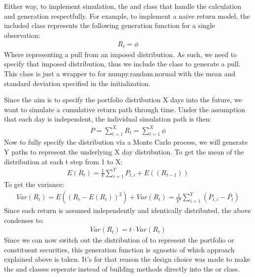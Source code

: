 \documentclass[letterpaper,10pt,english]{sphinxmanual}
\begin{document}
Either way, to implement simulation, the  and
 class that handle the calculation and generation
respectfully. For example, to implement a naive return model, the
included  class represents the following generation
function for a single observation:
\begin{equation*}
\begin{split}R_{t} = \phi\end{split}
\end{equation*}
Where \phi representing a pull from an imposed distribution. As
such, we need to specify that imposed distribution, thus we include the
 class to generate a pull. This class
is just a wrapper to for numpy.random.normal with the mean and standard
deviation specified in the initialization.

Since the aim is to specify the portfolio distribution X days into the
future, we want to simulate a cumulative return path through time. Under
the assumption that each day is independent, the individual simulation
path is then:
\begin{equation*}
\begin{split}P = \sum_{t=1}^{X} R_{t} = \sum_{t=1}^{X} \phi\end{split}
\end{equation*}
Now to fully specify the distribution via a Monte Carlo process, we will
generate Y paths to represent the underlying X day
distribution. To get the mean of the distribution at each t step
from 1 to X:
\begin{equation*}
\begin{split}E(R_{t}) = \frac{1}{Y} \sum_{i=1}^{Y} P_{t, i} + E((R_{t-1}))\end{split}
\end{equation*}
To get the variance:
\begin{equation*}
\begin{split}Var(R_{t}) = E\left(\left(R_{t} - E(R_{t})\right)^{2}\right) + Var(R_{t}) = \frac{1}{Y^{2}} \sum_{i=1}^{Y}\left(P_{t,i} - \bar{P_{t}} \right)\end{split}
\end{equation*}
Since each return is assumed independently and identically distributed,
the above condenses to:
\begin{equation*}
\begin{split}Var(R_{t}) = t \cdot Var(R_{t})\end{split}
\end{equation*}
Since we can now switch out the distribution of \phi to
represent the portfolio or constituent securities, this generation
function is agnostic of which approach explained above is taken. It’s
for that reason the design choice was made to make the 
and  classes seperate instead of building methods
directly into the  or  class.
\end{document}
